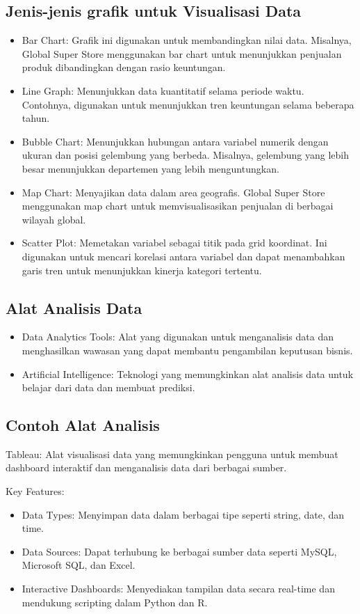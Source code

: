 \documentclass{article}
\begin{document}
\subsection{Jenis-jenis grafik untuk Visualisasi Data}
\begin{itemize}
    \item Bar Chart: Grafik ini digunakan untuk membandingkan nilai data. Misalnya, Global Super Store menggunakan bar chart untuk menunjukkan penjualan produk dibandingkan dengan rasio keuntungan.
    \item Line Graph: Menunjukkan data kuantitatif selama periode waktu. Contohnya, digunakan untuk menunjukkan tren keuntungan selama beberapa tahun.
    \item Bubble Chart: Menunjukkan hubungan antara variabel numerik dengan ukuran dan posisi gelembung yang berbeda. Misalnya, gelembung yang lebih besar menunjukkan departemen yang lebih menguntungkan.
    \item Map Chart: Menyajikan data dalam area geografis. Global Super Store menggunakan map chart untuk memvisualisasikan penjualan di berbagai wilayah global.
    \item Scatter Plot: Memetakan variabel sebagai titik pada grid koordinat. Ini digunakan untuk mencari korelasi antara variabel dan dapat menambahkan garis tren untuk menunjukkan kinerja kategori tertentu.
\end{itemize}

\subsection{Alat Analisis Data}
\begin{itemize}
    \item Data Analytics Tools: Alat yang digunakan untuk menganalisis data dan menghasilkan wawasan yang dapat membantu pengambilan keputusan bisnis.
    \item Artificial Intelligence: Teknologi yang memungkinkan alat analisis data untuk belajar dari data dan membuat prediksi.
\end{itemize}

\subsection{Contoh Alat Analisis}
Tableau: Alat visualisasi data yang memungkinkan pengguna untuk membuat dashboard interaktif dan menganalisis data dari berbagai sumber.

Key Features:
\begin{itemize}
    \item Data Types: Menyimpan data dalam berbagai tipe seperti string, date, dan time.
    \item Data Sources: Dapat terhubung ke berbagai sumber data seperti MySQL, Microsoft SQL, dan Excel.
    \item Interactive Dashboards: Menyediakan tampilan data secara real-time dan mendukung scripting dalam Python dan R.
\end{itemize}
\end{document}
